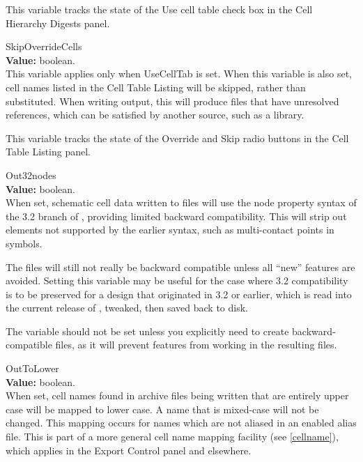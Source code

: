 \begin{description}
This variable tracks the state of the {\cb Use cell table} check box
in the {\cb Cell Hierarchy Digests} panel.

\item{\et SkipOverrideCells}\\
{\bf Value:} boolean.\\
This variable applies only when {\et UseCellTab} is set.  When this
variable is also set, cell names listed in the {\cb Cell Table
Listing} will be skipped, rather than substituted.  When writing
output, this will produce files that have unresolved references, which
can be satisfied by another source, such as a library.

This variable tracks the state of the {\cb Override} and {\cb Skip}
radio buttons in the {\cb Cell Table Listing} panel.

\item{\et Out32nodes}\\
{\bf Value:} boolean.\\
When set, schematic cell data written to files will use the {\et node}
property syntax of the 3.2 branch of {\Xic}, providing limited
backward compatibility.  This will strip out elements not supported by
the earlier syntax, such as multi-contact points in symbols.

The files will still not really be backward compatible unless all
``new'' features are avoided.  Setting this variable may be useful for
the case where 3.2 compatibility is to be preserved for a design that
originated in 3.2 or earlier, which is read into the current release
of {\Xic}, tweaked, then saved back to disk.

The variable should not be set unless you explicitly need to create
backward-compatible files, as it will prevent features from working in
the resulting files.

\item{\et OutToLower}\\
{\bf Value:} boolean.\\
When set, cell names found in archive files being written that are
entirely upper case will be mapped to lower case.  A name that is
mixed-case will not be changed.  This mapping occurs for names which
are not aliased in an enabled alias file.  This is part of a more
general cell name mapping facility (see \ref{cellname}), which applies
in the {\cb Export Control} panel and elsewhere.


\end{description}
